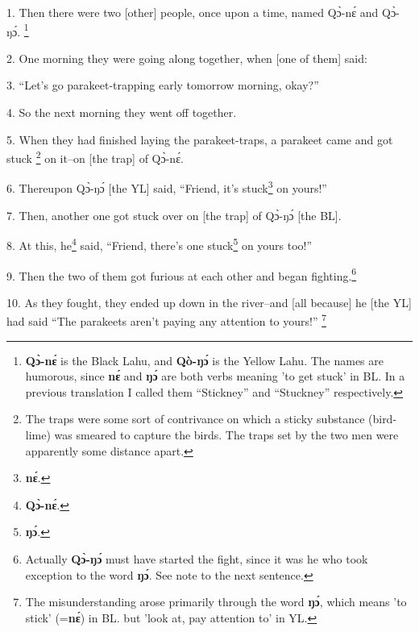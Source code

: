 \setcounter{footnote}{0}

1. Then there were two [other] people, once upon a time, named Qɔ̀-nɛ́ and Qɔ̀-ŋɔ́.
\footnote{\textbf{Qɔ̀-nɛ́} is the Black Lahu, and \textbf{Qò-ŋɔ́} is the Yellow Lahu. The names are humorous, since \textbf{nɛ́} and \textbf{ŋɔ́} are both verbs meaning 'to get stuck' in BL. In a previous translation I called them ``Stickney'' and ``Stuckney'' respectively.}

2. One morning they were going along together, when [one of them] said:

3. ``Let's go parakeet-trapping early tomorrow morning, okay?''

4. So the next morning they went off together.

5. When they had finished laying the parakeet-traps, a parakeet came and got stuck
\footnote{The traps were some sort of contrivance on which a sticky substance (bird-lime) was smeared to capture the birds. The traps set by the two men were apparently some distance apart.} on it--on [the trap] of Qɔ̀-nɛ́.

6. Thereupon Qɔ̀-ŋɔ́ [the YL] said, ``Friend, it's stuck\footnote{\textbf{nɛ́}.} on yours!''

7. Then, another one got stuck over on [the trap] of Qɔ̀-ŋɔ́ [the BL].

8. At this, he\footnote{\textbf{Qɔ̀-nɛ́}.} said, ``Friend, there's one stuck\footnote{\textbf{ŋɔ́}.} on yours too!''

9. Then the two of them got furious at each other and began fighting.\footnote{Actually \textbf{Qɔ̀-ŋɔ́} must have started the fight, since it was he who took exception to the word \textbf{ŋɔ́}. See note to the next sentence.}

10. As they fought, they ended up down in the river--and [all because] he [the YL]
had said ``The parakeets aren't paying any attention to yours!''
\footnote{The misunderstanding arose primarily through the word \textbf{ŋɔ́}, which means 'to stick' (=\textbf{nɛ́}) in BL. but 'look at, pay attention to' in YL.}

